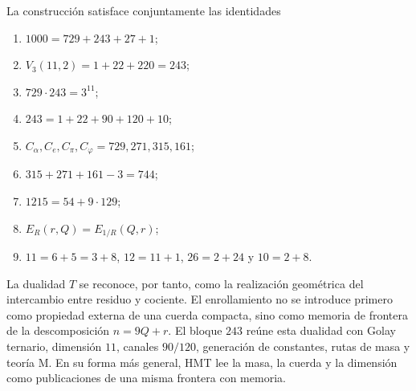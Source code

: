 La construcción satisface conjuntamente las identidades
\begin{enumerate}
\item \(1000=729+243+27+1\);
\item \(V_3(11,2)=1+22+220=243\);
\item \(729\cdot243=3^{11}\);
\item \(243=1+22+90+120+10\);
\item \(C_\alpha,C_e,C_\pi,C_\varphi=729,271,315,161\);
\item \(315+271+161-3=744\);
\item \(1215=54+9\cdot129\);
\item \(E_R(r,Q)=E_{1/R}(Q,r)\);
\item \(11=6+5=3+8\), \(12=11+1\), \(26=2+24\) y \(10=2+8\).
\end{enumerate}

La dualidad \(T\) se reconoce, por tanto, como la realización geométrica del
intercambio entre residuo y cociente. El enrollamiento no se introduce
primero como propiedad externa de una cuerda compacta, sino como memoria de
frontera de la descomposición \(n=9Q+r\). El bloque \(243\) reúne esta
dualidad con Golay ternario, dimensión \(11\), canales \(90/120\), generación
de constantes, rutas de masa y teoría M. En su forma más general, HMT lee la
masa, la cuerda y la dimensión como publicaciones de una misma frontera con
memoria.
